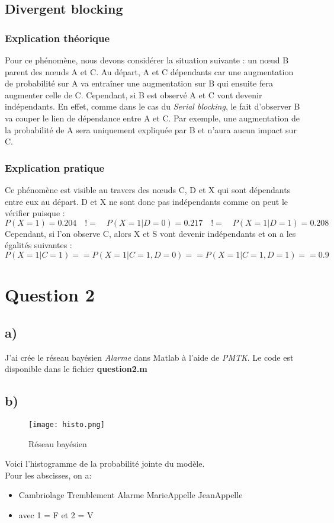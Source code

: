 \documentclass[12pt]{article}
\begin{document}
\subsection{Divergent blocking}
\subsubsection{Explication théorique}
Pour ce phénomène, nous devons considérer la situation suivante : un nœud B parent des nœuds A et C.
Au départ, A et C dépendants car une augmentation de probabilité sur A va entraîner une augmentation sur B qui ensuite fera augmenter celle de C. Cependant, si B est observé A et C vont devenir indépendants. En effet, comme dans le cas du \textit{Serial blocking}, le fait d'observer B va couper le lien de dépendance entre A et C. Par exemple, une augmentation de la probabilité de A sera uniquement expliquée par B et n'aura aucun impact sur C.
\subsubsection{Explication pratique}
Ce phénomène est visible au travers des nœuds C, D et X qui sont dépendants entre eux au départ. D et X ne sont donc pas indépendants comme on peut le vérifier puisque : $P(X=1)=0.204\quad != \quad P(X=1|D=0)=0.217\quad !=\quad P(X=1|D=1)=0.208$ \\
Cependant, si l'on observe C, alors X et S vont devenir indépendants et on a les égalités suivantes : \\
$P(X=1|C=1) == P(X=1|C=1,D=0) == P(X=1|C=1,D=1) == 0.9$

\section{Question 2}
\subsection{a)} J'ai crée le réseau bayésien \textit{Alarme} dans Matlab à l'aide de \textit{PMTK}. Le code est disponible dans le fichier \textbf{question2.m}
\subsection{b)}
\begin{figure}[H]
  \texttt{[image: histo.png]}
  \caption{Réseau bayésien}
  \label{fig:reseau_bayesien}
\end{figure}
Voici l'histogramme de la probabilité jointe du modèle.
\\Pour les abscisses, on a: 
\begin{itemize}
\item Cambriolage Tremblement Alarme MarieAppelle JeanAppelle
\item avec 1 = F et 2 = V
\end{itemize}
\end{document}

